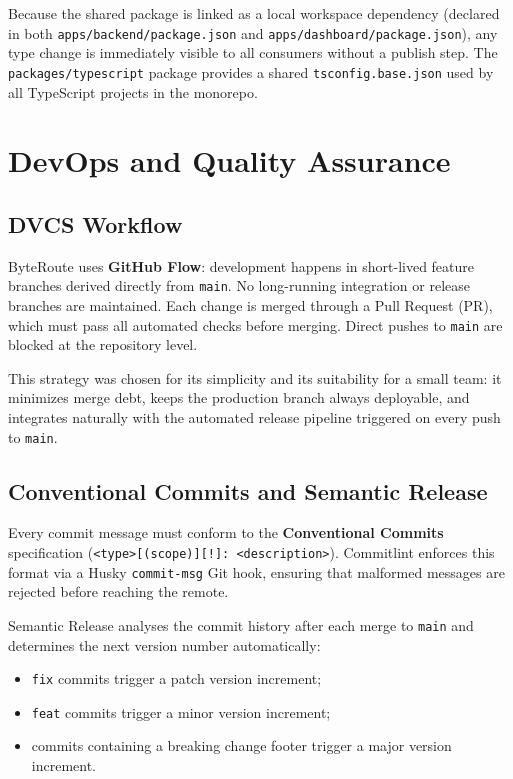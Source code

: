\documentclass[12pt]{report}
\begin{document}
Because the shared package is linked as a local workspace dependency (declared
in both \texttt{apps/backend/package.json} and \texttt{apps/dashboard/package.json}),
any type change is immediately visible to all consumers without a publish step.
The \texttt{packages/typescript} package provides a shared
\texttt{tsconfig.base.json} used by all TypeScript projects in the monorepo.

\chapter{DevOps and Quality Assurance}
\label{chap:devops}

\section{DVCS Workflow}

ByteRoute uses \textbf{GitHub Flow}: development happens in short-lived feature
branches derived directly from \texttt{main}. No long-running integration or
release branches are maintained. Each change is merged through a Pull Request
(PR), which must pass all automated checks before merging. Direct pushes to
\texttt{main} are blocked at the repository level.

This strategy was chosen for its simplicity and its suitability for a small
team: it minimizes merge debt, keeps the production branch always deployable,
and integrates naturally with the automated release pipeline triggered on every
push to \texttt{main}.

\section{Conventional Commits and Semantic Release}

Every commit message must conform to the \textbf{Conventional Commits}
specification (\texttt{<type>[(scope)][!]: <description>}). Commitlint enforces
this format via a Husky \texttt{commit-msg} Git hook, ensuring that malformed
messages are rejected before reaching the remote.

Semantic Release analyses the commit history after each merge to \texttt{main}
and determines the next version number automatically:

\begin{itemize}
  \item \texttt{fix} commits trigger a patch version increment;
  \item \texttt{feat} commits trigger a minor version increment;
  \item commits containing a breaking change footer trigger a major version
    increment.
\end{itemize}
\end{document}
